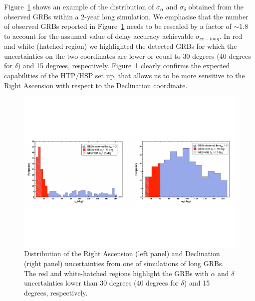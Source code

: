 \documentclass[]{spie}  %
\begin{document}
Figure~\ref{fig:res_long} shows an example of the distribution of $\sigma_\alpha$ and $\sigma_\delta$ obtained from the observed GRBs within a 2-year long simulation. We emphasise that the number of observed GRBs reported in Figure~\ref{fig:res_long} needs to be rescaled by a factor of $\sim1.8$ to account for the assumed value of delay accuracy achievable $\sigma_{cc-long}$. In red and white (hatched region) we highlighted the detected GRBs for which the uncertainties on the two coordinates are lower or equal to 30 degrees (40 degrees for $\delta$) and 15 degrees, respectively. Figure~\ref{fig:res_long} clearly confirms the expected capabilities of the HTP/HSP set up, that allows us to be more sensitive to the Right Ascension with respect to the Declination coordinate.  
\vspace{-3cm}
\begin{figure}[h!]
\centering
\includegraphics[scale=0.6,angle=0]{res_long_pos}
\vspace{-4cm}
\caption{Distribution of the Right Ascension (left panel) and Declination (right panel) uncertainties from one of simulations of long GRBs. The red and white-hatched regions highlight the GRBs with $\alpha$ and $\delta$ uncertainties lower than 30 degrees (40 degrees for $\delta$) and 15 degrees, respectively.} 
\label{fig:res_long}
\end{figure}
\end{document}
